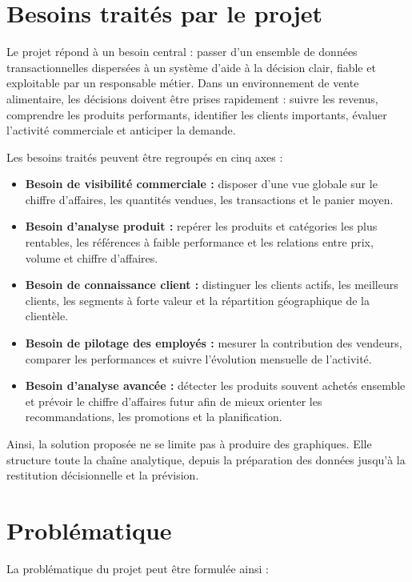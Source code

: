 \documentclass[12pt,a4paper,twoside]{report}
\begin{document}
\section{Besoins traités par le projet}

Le projet répond à un besoin central : passer d'un ensemble de données transactionnelles dispersées à un système d'aide à la décision clair, fiable et exploitable par un responsable métier. Dans un environnement de vente alimentaire, les décisions doivent être prises rapidement : suivre les revenus, comprendre les produits performants, identifier les clients importants, évaluer l'activité commerciale et anticiper la demande.

Les besoins traités peuvent être regroupés en cinq axes :

\begin{itemize}
  \item \textbf{Besoin de visibilité commerciale :} disposer d'une vue globale sur le chiffre d'affaires, les quantités vendues, les transactions et le panier moyen.
  \item \textbf{Besoin d'analyse produit :} repérer les produits et catégories les plus rentables, les références à faible performance et les relations entre prix, volume et chiffre d'affaires.
  \item \textbf{Besoin de connaissance client :} distinguer les clients actifs, les meilleurs clients, les segments à forte valeur et la répartition géographique de la clientèle.
  \item \textbf{Besoin de pilotage des employés :} mesurer la contribution des vendeurs, comparer les performances et suivre l'évolution mensuelle de l'activité.
  \item \textbf{Besoin d'analyse avancée :} détecter les produits souvent achetés ensemble et prévoir le chiffre d'affaires futur afin de mieux orienter les recommandations, les promotions et la planification.
\end{itemize}

Ainsi, la solution proposée ne se limite pas à produire des graphiques. Elle structure toute la chaîne analytique, depuis la préparation des données jusqu'à la restitution décisionnelle et la prévision.

\section{Problématique}

La problématique du projet peut être formulée ainsi :
\end{document}
